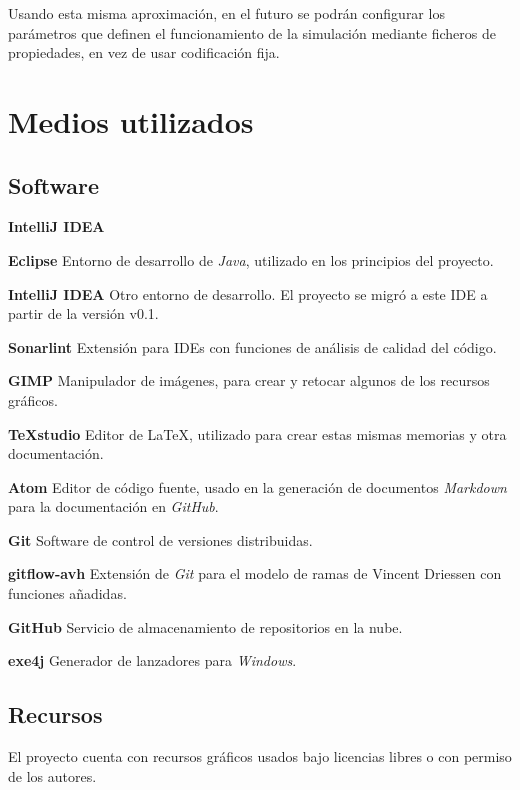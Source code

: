 \documentclass[a4paper,
	11pt,
	parskip=full,
	bibliography=totoc,
	twoside
	]{scrartcl}
\let\oldsection\section
\def\section{\cleardoubleoddpage\oldsection}
\begin{document}
		Usando esta misma aproximación, en el futuro se podrán configurar los parámetros que definen el funcionamiento de la simulación mediante ficheros de propiedades, en vez de usar codificación fija.
	
\section{Medios utilizados}
\label{sec:medios}
\onehalfspacing
	\subsection{Software}
	\begin{labeling}{\textbf{IntelliJ IDEA}}
		\item[\textbf{Eclipse}] Entorno de desarrollo de \textit{Java}, utilizado en los principios del proyecto.
		\item[\textbf{IntelliJ IDEA}] Otro entorno de desarrollo. El proyecto se migró a este IDE a partir de la versión v0.1.
		\item[\textbf{Sonarlint}] Extensión para IDEs con funciones de análisis de calidad del código.
		\item[\textbf{GIMP}] Manipulador de imágenes, para crear y retocar algunos de los recursos gráficos.
		\item[\textbf{TeXstudio}] Editor de \LaTeX, utilizado para crear estas mismas memorias y otra documentación.
		\item[\textbf{Atom}] Editor de código fuente, usado en la generación de documentos \textit{Markdown} para la documentación en \textit{GitHub}.
		\item[\textbf{Git}] Software de control de versiones distribuidas.
		\item[\textbf{gitflow-avh}] Extensión de \textit{Git} para el modelo de ramas de Vincent Driessen con funciones añadidas.
		\item[\textbf{GitHub}] Servicio de almacenamiento de repositorios en la nube.
		\item[\textbf{exe4j}] Generador de lanzadores para \textit{Windows}.
	\end{labeling}
	
	\subsection{Recursos}
	\label{subsec:recursos}
	El proyecto cuenta con recursos gráficos usados bajo licencias libres o con permiso de los autores.
	
\end{document}
